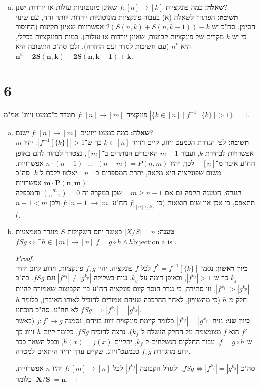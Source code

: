 \documentclass[]{article}
\newcommand\op    {^{-1}}
\begin{document}
\begin{enumerate}[(a)]
		\item \textbf{שאלה: } כמה פונקציות $f \colon [n] \to [k]$ שאינן מונוטוניות עולות או יורדות ישנן? \\
		\textbf{תשובה: }הפתרון לשאלה (א) בעבור פונקציות מונוטוניות יורדות יוותר זהה, עם שינוי הסימן. סה"כ יש $ 2(S(n, k) + S(n, k - 1)) - k $ אפשרויות שאינן תקינות (החיסור כי יש $k$ מקרים של פונקציות קבועות, שאינן יורדות או עולות). כמות הפונקציות בכללי, היא $n^k$ (עם חשיבות לסדר ועם החזרה), ולכן סה"כ התשובה היא $\bm{n^k - 2S(n, k) - 2S(n, k - 1) + k}$. 
	\end{enumerate}
	\section*{6} %
	פונקציה $f \colon [n] \to [m]$ תוגדר כ"כמעט זיווג" אמ"מ	$|\{k \in [n] \mid f\op[\{k\}] > 1\}| = 1$. 
	\begin{enumerate}[(a)]
		\item \textbf{שאלה: }כמה כמעט־זיווגים $f \colon [n] \to [m]$ ישנם? \\
		\textbf{תשובה: }לפי הגדרת הכמעט זיווג, קיים ויחיד $k \in [n]$ כך ש־$|f\op[\{k\}]| > 1$. יהיו $m$ אפשרויות לבחירת $k$, ועבור $m - 1$ האיברים הנותרים ב־$[m]$, נצטרך לבחור להם באופן חח"ע איבר מ־$[n]$ – לכך, יהיו $n \cdot (n - 1) \cdot \dots \cdot (n - m) = P(n, m)$ אפשרויות. משום שפונקציה היא מלאה, יתרת המספרים ב־$[n]$ יאלצו ללכת ל־$k$. סה"כ $\bm{m \cdot P(n, m)}$ אפשרויות.  \\
		\textit{הערה: }הטענה תקפה גם אם $ \lnot m \ge n - 1 $. שכן במקרה זה $\binom{m}{n - 1} = 0 $ והמכפלה תתאפס, כי אכן אין שום תוצאות (כי $f|_{[n] \setminus \{k\}}$ חח"ע $f \colon |n - 1| \to |m|$ ולכן $n - 1 < m$). 
		\item \textbf{טענה: }$|X / S| = n$ כאשר יחס השקילות $S$ מוגדר באמצעות $fSg \iff \exists h \in [m] \to [n]. f = g \circ h \land h \text{bijection a is  }$. 
	\begin{proof} \ \\
		\textbf{כיוון ראשון: }נסמן $f^k = f\op[\{k\}]$ לכל $f$ פונקציה. יהיו $f, g$ פונקציות, וידוע קיום יחיד $k_f$ כך ש־$|f^{k_f}| > 1 $, ובאופן דומה על $k_g$. נניח בשלילה $|f^{k_f}| \neq |g^{k_g}|$ וגם $fSg$. בה"כ $|f^{k_f}| > |g^{k_g}|$, וזו סתירה, כי נגרר חוסר קיום פונקציה חח"ע בין הקבוצות שאמורה להיות חלק מ־$h$ (כי מהשוויון, לאחר ההרכבה שניהם אמורים להוביל לאותו האיבר), כלומר $h$ לא חח"ע. סה"כ הוכחנו $fSg \implies |f^{k_f}| = |g^{k_g}|$. \\
		\textbf{כיוון שני: }נניח $|f^{k_f}| = |g^{k_g}| $ כלומר קיימת פונקצית זיווג בניהם, נסמנה $j \colon f' \to g$ (כאשר $f'$ הוא $f$ מצומצמת על החלק הנשלח ל־$k_f$). נרצה להוכיח $fSg$, כלומר קיום $h$ זיווג כך ש־$f = g \circ h$. עבור החלקים הנשלחים ל־$k_f$, יתקיים $h(x) = j(x)$, ובכל השאר כבר ידוע מהגדרת $f, g $ ככמעט־זיווג, שקיים ערך יחיד היתאים למטרה. 
		
		סה"כ $fSg \iff |f^{k_f}| = |g^{k_g}|$, ולגודל הקבוצה $|f^{k_f}|$ לכל $f \colon [m] \to [n]$ יהיו $n$ אפשרויות, כלומר $\bm{|X / S| = n}$. 
	\end{proof}
	
	
	\end{enumerate}
\end{document}
